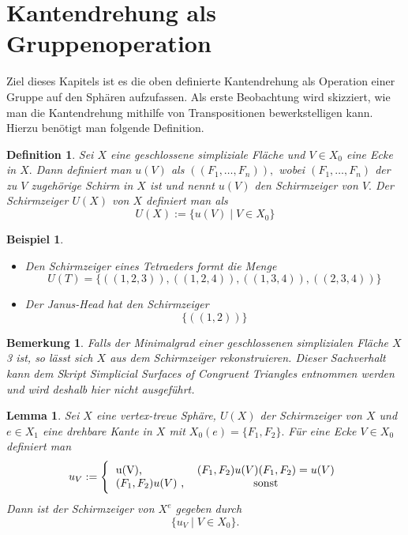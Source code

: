 \documentclass[12pt,titlepage,twoside,cleardoublepage]{article}
\theoremstyle{nummermitklammern}
\newtheorem{lemma}[temp]{Lemma}
\newtheorem{bsp}[temp]{Beispiel}
\newtheorem{definition}[temp]{Definition}
\newtheorem{bemerkung}[temp]{Bemerkung}
\newtheorem{definition}[zahl]{Definition}
\newtheorem{lemma}[zahl]{Lemma}
\newtheorem{bsp}[zahl]{Beispiel}
\newtheorem{bemerkung}[zahl]{Bemerkung}
\numberwithin{equation}{section}
\begin{document}
\section{Kantendrehung als Gruppenoperation}
Ziel dieses Kapitels ist es die oben definierte Kantendrehung als Operation einer Gruppe auf den Sphären aufzufassen. Als erste Beobachtung wird skizziert, wie man die Kantendrehung mithilfe von Transpositionen bewerkstelligen kann. Hierzu benötigt man folgende Definition. 
\begin{definition}
Sei $X$ eine geschlossene simpliziale Fläche und $V\in X_0$ eine Ecke in $X.$ Dann definiert man $u(V)$ als $((F_1, \ldots , F_n)),$ wobei $(F_1,\ldots,F_n)$ der zu $V$ zugehörige Schirm in $X$ ist und nennt $u(V)$ den \emph{Schirmzeiger} von $V.$ Der \emph{Schirmzeiger} $U(X)$ von $X$ definiert man als 
\[
U(X):=\{u(V) \mid V\in X_0\}
\]
\end{definition}
\begin{bsp}
\begin{itemize}
\item 
Den Schirmzeiger eines Tetraeders formt die Menge 
\[
U(T)=\{ ((1,2,3)),((1,2,4)),((1,3,4)),((2,3,4))\}
\]
\item Der Janus-Head hat den Schirmzeiger 
\[
\{((1,2))\}
\]
\end{itemize}
\end{bsp}
\begin{bemerkung}
Falls der Minimalgrad einer geschlossenen simplizialen Fläche $X$ 3 ist, so lässt sich $X$ aus dem Schirmzeiger rekonstruieren. Dieser Sachverhalt kann dem Skript \emph{Simplicial Surfaces of Congruent Triangles} entnommen werden und wird deshalb hier nicht ausgeführt.
\end{bemerkung}
\begin{lemma}
Sei $X$ eine vertex-treue Sphäre, $U(X)$ der Schirmzeiger von $X$ und $e\in X_1$ eine drehbare Kante in $X$ mit $X_0(e)=\{F_1,F_2\}.$ Für eine Ecke $V\in X_0$ definiert man  
\[
u_V:=
\Biggl\{
\begin{tabular}[l]{lcr}
u(V),& $(F_1,F_2)u(V)(F_1,F_2)=u(V)$ \\
$(F_1,F_2) u(V)$ ,& sonst \\

\end{tabular}
\]
Dann ist der Schirmzeiger von $X^e$ gegeben durch 
\[
\{ u_V\mid V \in X_0\}.
\]
\end{lemma}
\end{document}
